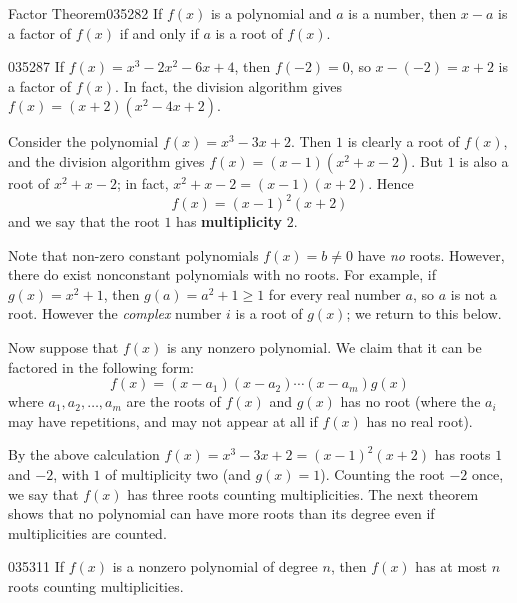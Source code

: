\begin{theorem}{Factor Theorem}{035282}
If $f(x)$ is a polynomial and $a$ is a number, then $x - a$ is a factor of $f(x)$ if and only if $a$ is a root of $f(x)$.
\end{theorem}

\begin{example}{}{035287}
If $f(x) = x^{3} - 2x^{2} - 6x + 4$, then $f(-2) = 0$, so $x - (-2) = x + 2$ is a factor of $f(x)$. In fact, the division algorithm gives $f(x) = (x + 2)(x^{2} - 4x + 2)$.
\end{example}

Consider the polynomial $f(x) = x^{3} - 3x + 2$. Then $1$ is clearly a root of $f(x)$, and the division algorithm gives $f(x) = (x - 1)(x^{2} + x - 2)$. But $1$ is also a root of $x^{2} + x - 2$; in fact, $x^{2} + x - 2 = (x - 1)(x + 2)$. Hence
\begin{equation*}
f(x) = (x-1)^2(x+2)
\end{equation*}
and we say that the root $1$ has \textbf{multiplicity} $2$.


Note that non-zero constant polynomials $f(x) = b \neq 0$ have \textit{no} roots. However, there do exist nonconstant polynomials with no roots. For example, if $g(x) = x^{2} + 1$, then $g(a) = a^{2} + 1 \geq 1$ for every real number $a$, so $a$ is not a root. However the \textit{complex} number $i$ is a root of $g(x)$; we return to this below.


Now suppose that $f(x)$ is any nonzero polynomial. We claim that it can be factored in the following form:
\begin{equation*}
f(x) = (x-a_1)(x-a_2) \cdots (x-a_m)g(x)
\end{equation*}
where $a_{1}, a_{2}, \dots, a_{m}$ are the roots of $f(x)$ and $g(x)$ has no root (where the $a_i$ may have repetitions, and may not appear at all if $f(x)$ has no real root).


By the above calculation $f(x) = x^{3} - 3x + 2 = (x - 1)^2(x + 2)$ has roots $1$ and $-2$, with $1$ of multiplicity two (and $g(x) = 1$). Counting the root $-2$ once, we say that $f(x)$
 has three roots counting multiplicities. The next theorem shows that no
 polynomial can have more roots than its degree even if multiplicities 
are counted.


\begin{theorem}{}{035311}
If $f(x)$ is a nonzero polynomial of degree $n$, then $f(x)$ has at most $n$ roots counting multiplicities.
\end{theorem}

